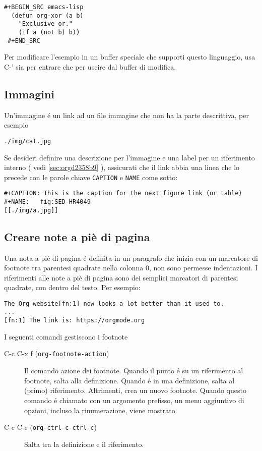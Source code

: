 \documentclass[11pt]{article}
\begin{document}
\begin{verbatim}
#+BEGIN_SRC emacs-lisp
  (defun org-xor (a b)
    "Exclusive or."
    (if a (not b) b))
 #+END_SRC
\end{verbatim}

Per modificare l'esempio in un buffer speciale che supporti questo
linguaggio, usa C-' sia per entrare che per uscire dal
buffer di modifica.

\subsection{Immagini}
\label{sec:org21f9253}
Un'immagine é un link ad un file immagine che non ha la parte
descrittiva, per esempio

\begin{verbatim}
./img/cat.jpg
\end{verbatim}


Se desideri definire una descrizione per l'immagine e una label per un
riferimento interno ( vedi \ref{sec:orgd2358b9} ), assicurati
che il link abbia una linea che lo precede con le parole chiave
\texttt{CAPTION} e \texttt{NAME} come sotto:

\begin{verbatim}
#+CAPTION: This is the caption for the next figure link (or table)
#+NAME:   fig:SED-HR4049
[[./img/a.jpg]]
\end{verbatim}

\subsection{Creare note a piè di pagina}
\label{sec:orgb51945d}
Una nota a piè di pagina é definita in un paragrafo che inizia con un
marcatore di footnote tra parentesi quadrate nella colonna 0,
non sono permesse indentazioni. I riferimenti alle note a piè di
pagina sono dei semplici marcatori di parentesi quadrate, con
dentro del testo. Per esempio:

\begin{verbatim}
The Org website[fn:1] now looks a lot better than it used to.
...
[fn:1] The link is: https://orgmode.org
\end{verbatim}

I seguenti comandi gestiscono i footnote

\begin{description}
\item[{C-c C-x f (\texttt{org-footnote-action})}] Il comando azione dei footnote. Quando il punto é su un riferimento
al footnote, salta alla definizione. Quando é in una definizione,
salta al (primo) riferimento. Altrimenti, crea un nuovo
footnote. Quando questo comando é chiamato con un argomento
prefisso, un menu aggiuntivo di opzioni, incluso la rinumerazione,
viene mostrato.

\item[{C-c C-c (\texttt{org-ctrl-c-ctrl-c})}] Salta tra la definizione e il riferimento.
\end{description}
\end{document}
